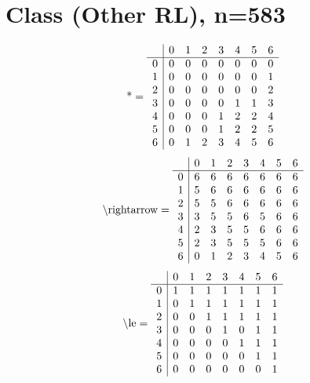 \documentclass[11pt]{article}
\begin{document}
\section{Class (Other RL), n=583}
\[\text{*} = 
\begin{array}{r | r r r r r r r}
 & 0 & 1 & 2 & 3 & 4 & 5 & 6 \\ \hline
0 & 0 & 0 & 0 & 0 & 0 & 0 & 0 \\
1 & 0 & 0 & 0 & 0 & 0 & 0 & 1 \\
2 & 0 & 0 & 0 & 0 & 0 & 0 & 2 \\
3 & 0 & 0 & 0 & 0 & 1 & 1 & 3 \\
4 & 0 & 0 & 0 & 1 & 2 & 2 & 4 \\
5 & 0 & 0 & 0 & 1 & 2 & 2 & 5 \\
6 & 0 & 1 & 2 & 3 & 4 & 5 & 6 \\
\end{array}
\]
\[\text{\textbackslash rightarrow} = 
\begin{array}{r | r r r r r r r}
 & 0 & 1 & 2 & 3 & 4 & 5 & 6 \\ \hline
0 & 6 & 6 & 6 & 6 & 6 & 6 & 6 \\
1 & 5 & 6 & 6 & 6 & 6 & 6 & 6 \\
2 & 5 & 5 & 6 & 6 & 6 & 6 & 6 \\
3 & 3 & 5 & 5 & 6 & 5 & 6 & 6 \\
4 & 2 & 3 & 5 & 5 & 6 & 6 & 6 \\
5 & 2 & 3 & 5 & 5 & 5 & 6 & 6 \\
6 & 0 & 1 & 2 & 3 & 4 & 5 & 6 \\
\end{array}
\]
\[\text{\textbackslash le} = 
\begin{array}{r | r r r r r r r}
 & 0 & 1 & 2 & 3 & 4 & 5 & 6 \\ \hline
0 & 1 & 1 & 1 & 1 & 1 & 1 & 1 \\
1 & 0 & 1 & 1 & 1 & 1 & 1 & 1 \\
2 & 0 & 0 & 1 & 1 & 1 & 1 & 1 \\
3 & 0 & 0 & 0 & 1 & 0 & 1 & 1 \\
4 & 0 & 0 & 0 & 0 & 1 & 1 & 1 \\
5 & 0 & 0 & 0 & 0 & 0 & 1 & 1 \\
6 & 0 & 0 & 0 & 0 & 0 & 0 & 1 \\
\end{array}
\]
\end{document}
